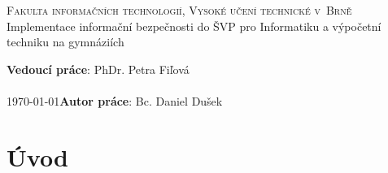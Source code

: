 \documentclass[a4paper, 11pt]{article}
\title{\thesisname}
\author{Bc. Daniel Dušek}
\newcommand{\thesisname}{Implementace informační bezpečnosti do ŠVP pro Informatiku a výpočetní techniku na gymnáziích}
\begin{document}
\thispagestyle{empty}
\begin{center}
\Huge
\textsc{Fakulta informačních technologií, Vysoké učení technické v~Brně}\\
\LARGE
{}
\thesisname
{}
\end{center}
{\Large \hfill \textbf{Vedoucí práce}: PhDr. Petra Fiľová}\\
\\
{\Large \today \hfill \textbf{Autor práce}: Bc. Daniel Dušek}~~~~~~~~\\





\newpage
\tableofcontents

\newpage
\setcounter{page}{1}
\section{Úvod}


% 


\end{document}
